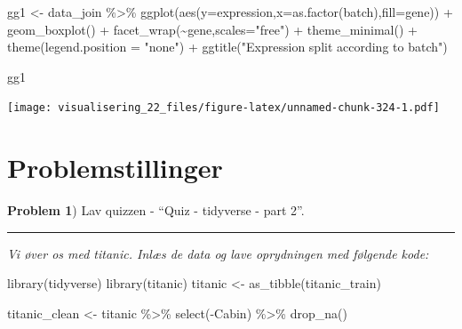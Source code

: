 \documentclass[
]{book}
\newenvironment{Shaded}{\begin{snugshade}}{\end{snugshade}}
\newcommand{\AttributeTok}[1]{\textcolor[rgb]{0.77,0.63,0.00}{#1}}
\newcommand{\FunctionTok}[1]{\textcolor[rgb]{0.00,0.00,0.00}{#1}}
\newcommand{\NormalTok}[1]{#1}
\newcommand{\OtherTok}[1]{\textcolor[rgb]{0.56,0.35,0.01}{#1}}
\newcommand{\SpecialCharTok}[1]{\textcolor[rgb]{0.00,0.00,0.00}{#1}}
\newcommand{\StringTok}[1]{\textcolor[rgb]{0.31,0.60,0.02}{#1}}
\begin{document}
\begin{Shaded}
\begin{Highlighting}[]
\NormalTok{gg1 }\OtherTok{\textless{}{-}}\NormalTok{ data\_join }\SpecialCharTok{\%\textgreater{}\%} 
  \FunctionTok{ggplot}\NormalTok{(}\FunctionTok{aes}\NormalTok{(}\AttributeTok{y=}\NormalTok{expression,}\AttributeTok{x=}\FunctionTok{as.factor}\NormalTok{(batch),}\AttributeTok{fill=}\NormalTok{gene)) }\SpecialCharTok{+} 
  \FunctionTok{geom\_boxplot}\NormalTok{() }\SpecialCharTok{+} 
  \FunctionTok{facet\_wrap}\NormalTok{(}\SpecialCharTok{\textasciitilde{}}\NormalTok{gene,}\AttributeTok{scales=}\StringTok{"free"}\NormalTok{) }\SpecialCharTok{+}
  \FunctionTok{theme\_minimal}\NormalTok{() }\SpecialCharTok{+}
  \FunctionTok{theme}\NormalTok{(}\AttributeTok{legend.position =} \StringTok{"none"}\NormalTok{) }\SpecialCharTok{+}
  \FunctionTok{ggtitle}\NormalTok{(}\StringTok{"Expression split according to batch"}\NormalTok{)}

\NormalTok{gg1}
\end{Highlighting}
\end{Shaded}

\texttt{[image: visualisering\_22\_files/figure-latex/unnamed-chunk-324-1.pdf]}

\hypertarget{problemstillinger-5}{%
\section{Problemstillinger}\label{problemstillinger-5}}

\textbf{Problem 1}) Lav quizzen - ``Quiz - tidyverse - part 2''.

\begin{center}\rule{0.5\linewidth}{0.5pt}\end{center}

\emph{Vi øver os med titanic. Inlæs de data og lave oprydningen med følgende kode:}

\begin{Shaded}
\begin{Highlighting}[]
\FunctionTok{library}\NormalTok{(tidyverse)}
\FunctionTok{library}\NormalTok{(titanic)}
\NormalTok{titanic }\OtherTok{\textless{}{-}} \FunctionTok{as\_tibble}\NormalTok{(titanic\_train)}

\NormalTok{titanic\_clean }\OtherTok{\textless{}{-}}\NormalTok{ titanic }\SpecialCharTok{\%\textgreater{}\%} 
    \FunctionTok{select}\NormalTok{(}\SpecialCharTok{{-}}\NormalTok{Cabin) }\SpecialCharTok{\%\textgreater{}\%} 
    \FunctionTok{drop\_na}\NormalTok{()}
\end{Highlighting}
\end{Shaded}
\end{document}
